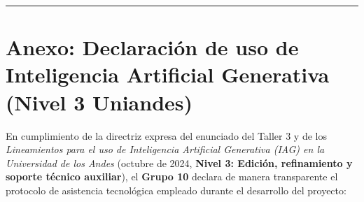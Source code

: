 \documentclass[
  10pt,
  letterpaper,
  DIV=11,
  numbers=noendperiod]{scrartcl}
\begin{document}
\begin{center}\rule{0.5\linewidth}{0.5pt}\end{center}

\section{Anexo: Declaración de uso de Inteligencia Artificial Generativa
(Nivel 3
Uniandes)}\label{anexo-declaraciuxf3n-de-uso-de-inteligencia-artificial-generativa-nivel-3-uniandes}

En cumplimiento de la directriz expresa del enunciado del Taller 3 y de
los \emph{Lineamientos para el uso de Inteligencia Artificial Generativa
(IAG) en la Universidad de los Andes} (octubre de 2024, \textbf{Nivel 3:
Edición, refinamiento y soporte técnico auxiliar}), el \textbf{Grupo 10}
declara de manera transparente el protocolo de asistencia tecnológica
empleado durante el desarrollo del proyecto:
\end{document}
